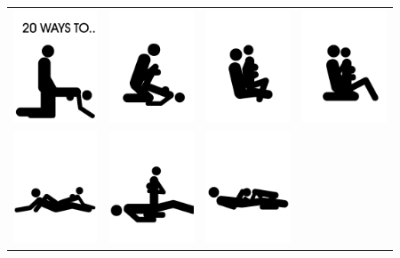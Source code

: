 
\begin{tabular}{cccc}
\includegraphics[width=2.5cm]{20waysto/f00.png}&
\includegraphics[width=2.5cm]{20waysto/f01.png}&
\includegraphics[width=2.5cm]{20waysto/f02.png}&
\includegraphics[width=2.5cm]{20waysto/f03.png}\\
\includegraphics[width=2.5cm]{20waysto/f10.png}&
\includegraphics[width=2.5cm]{20waysto/f11.png}&
\includegraphics[width=2.5cm]{20waysto/f12.png}&

\end{tabular}
